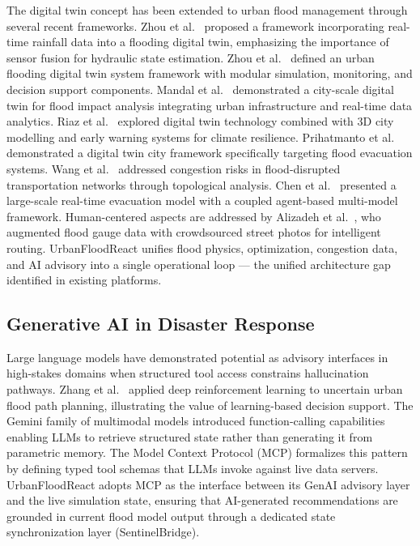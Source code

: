 \documentclass[journal]{IEEEtran}
\begin{document}
The digital twin concept \cite{grieves2014} has been extended to urban flood management
through several recent frameworks. Zhou et al.\ \cite{zhou2025rainfall} proposed a
framework incorporating real-time rainfall data into a flooding digital twin, emphasizing
the importance of sensor fusion for hydraulic state estimation. Zhou et al.\
\cite{zhou2024framework} defined an urban flooding digital twin system framework with
modular simulation, monitoring, and decision support components. Mandal et al.\
\cite{mandal2025cityscale} demonstrated a city-scale digital twin for flood impact analysis
integrating urban infrastructure and real-time data analytics. Riaz et al.\
\cite{riaz2023climate} explored digital twin technology combined with 3D city modelling and
early warning systems for climate resilience. Prihatmanto et al.\
\cite{prihatmanto2025digitaltwin} demonstrated a digital twin city framework specifically
targeting flood evacuation systems. Wang et al.\ \cite{wang2024congestion} addressed
congestion risks in flood-disrupted transportation networks through topological analysis.
Chen et al.\ \cite{chen2025evacuation} presented a large-scale real-time evacuation model
with a coupled agent-based multi-model framework. Human-centered aspects are addressed by
Alizadeh et al.\ \cite{alizadeh2023humancentered}, who augmented flood gauge data with
crowdsourced street photos for intelligent routing. UrbanFloodReact unifies flood physics,
optimization, congestion data, and AI advisory into a single operational loop — the
unified architecture gap identified in existing platforms.

\subsection{Generative AI in Disaster Response}

Large language models have demonstrated potential as advisory interfaces in high-stakes
domains when structured tool access constrains hallucination pathways. Zhang et al.\
\cite{zhang2023drl} applied deep reinforcement learning to uncertain urban flood path
planning, illustrating the value of learning-based decision support. The Gemini family of
multimodal models \cite{gemini2023} introduced function-calling capabilities enabling LLMs
to retrieve structured state rather than generating it from parametric memory. The Model
Context Protocol (MCP) \cite{anthropic2024mcp} formalizes this pattern by defining typed
tool schemas that LLMs invoke against live data servers. UrbanFloodReact adopts MCP as the
interface between its GenAI advisory layer and the live simulation state, ensuring that
AI-generated recommendations are grounded in current flood model output through a dedicated
state synchronization layer (SentinelBridge).
\end{document}
